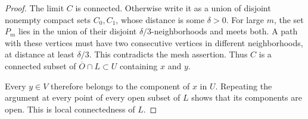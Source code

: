 \begin{proof}
The limit $C$ is connected.
Otherwise write it as a union of disjoint nonempty compact sets $C_0,C_1$,
whose distance is some $\delta>0$.
For large $m$, the set $P_m$ lies in the union of their disjoint
$\delta/3$-neighborhoods and meets both.
A path with these vertices must have two consecutive vertices in
different neighborhoods, at distance at least $\delta/3$.
This contradicts the mesh assertion.
Thus $C$ is a connected subset of $\overline O\cap L\subset U$
containing $x$ and $y$.

Every $y\in V$ therefore belongs to the component of $x$ in $U$.
Repeating the argument at every point of every open subset of $L$ shows
that its components are open.  This is local connectedness of $L$.
\end{proof}
